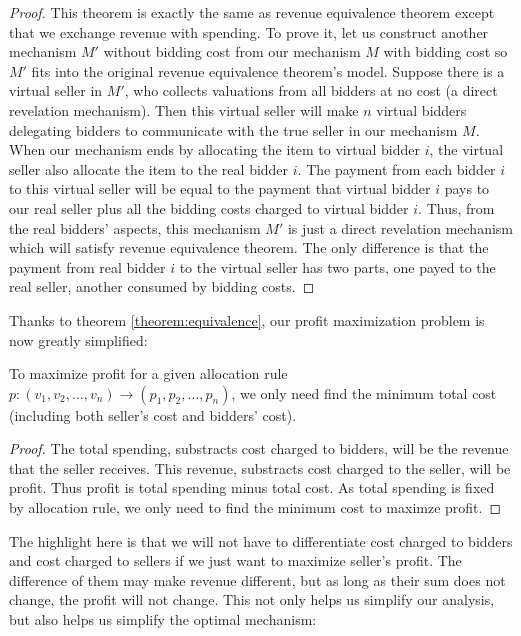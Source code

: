 \begin{proof}
This theorem is exactly the same as revenue equivalence theorem except that we
exchange revenue with spending. To prove it, let us construct another mechanism
$M'$ without bidding cost from our mechanism $M$ with bidding cost so $M'$ fits
into the original revenue equivalence theorem's model. Suppose there is a
virtual seller in $M'$, who collects valuations from all bidders at no cost (a
direct revelation mechanism). Then this virtual seller will make $n$ virtual
bidders delegating bidders to communicate with the true seller in our mechanism
$M$.  When our mechanism ends by allocating the item to virtual bidder $i$, the
virtual seller also allocate the item to the real bidder $i$. The payment from
each bidder $i$ to this virtual seller will be equal to the payment that
virtual bidder $i$ pays to our real seller plus all the bidding costs charged
to virtual bidder $i$. Thus, from the real bidders' aspects, this mechanism
$M'$ is just a direct revelation mechanism which will satisfy revenue
equivalence theorem. The only difference is that the payment from real bidder
$i$ to the virtual seller has two parts, one payed to the real
seller, another consumed by bidding costs.%
\end{proof}

Thanks to theorem \ref{theorem:equivalence}, our profit maximization problem
is now greatly simplified: 

\begin{corollary}
To maximize profit for a given allocation rule $p: (v_1, v_2, \ldots, v_n)
\rightarrow (p_1, p_2, \ldots, p_n)$, we only need find the minimum total cost
(including both seller's cost and bidders' cost).
\end{corollary}

\begin{proof}
The total spending, substracts cost charged to bidders, will be the revenue
that the seller receives.  This revenue, substracts cost charged to the seller,
will be profit. Thus profit is total spending minus total cost. As total
spending is fixed by allocation rule, we only need to find the minimum cost to
maximze profit.
\end{proof}

The highlight here is that we will not have to differentiate cost charged to
bidders and cost charged to sellers if we just want to maximize seller's profit.
The difference of them may make revenue different, but as long as their sum
does not change, the profit will not change. This not only helps us simplify our
analysis, but also helps us simplify the optimal mechanism: 

